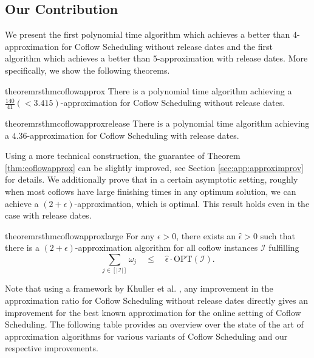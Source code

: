 \documentclass[11pt]{article}
\begin{document}
\subsection{Our Contribution}
\noindent We present the first polynomial time algorithm which achieves a better than $4$-approximation for Coflow Scheduling without release dates and the first algorithm which achieves a better than $5$-approximation with release dates.
More specifically, we show the following theorems.

\begin{restatable}{theorem}{rsthmcoflowapprox}\label{thm:coflowapprox}
There is a polynomial time algorithm achieving a $\frac{140}{41} (<3.415)$-approximation for Coflow Scheduling without release dates.
\end{restatable}

\begin{restatable}{theorem}{rsthmcoflowapproxrelease}\label{thm:coflowapproxrelease}
There is a polynomial time algorithm achieving a $4.36$-approximation for Coflow Scheduling with release dates.
\end{restatable}

Using a more technical construction, the guarantee of Theorem \ref{thm:coflowapprox} can be slightly improved, see Section \ref{sec:app:approximprov} for details. We additionally prove that in a certain asymptotic setting, roughly when most coflows have large finishing times in any optimum solution, we can achieve a $(2+\epsilon)$-approximation, which is optimal. This result holds even in the case with release dates.

\begin{restatable}{theorem}{rsthmcoflowapproxlarge}\label{thm:coflowapproxlarge}
 For any $\epsilon > 0$, there exists an $\hat{\epsilon} > 0$ such that there is a $(2+\epsilon)$-approximation algorithm for all coflow instances $\mathcal{I}$ fulfilling
 \begin{equation*}
     \sum_{j \in [|\mathcal{I}|]}\omega_j \quad \le \quad \hat{\epsilon}\cdot \mathrm{OPT}(\mathcal{I}).
 \end{equation*}
\end{restatable}

\noindent Note that using a framework by Khuller et al. \cite{khuller_select_2019}, any improvement in the approximation ratio for Coflow Scheduling without release dates directly gives an improvement for the best known approximation for the online setting of Coflow Scheduling.
The following table provides an overview over the state of the art of approximation algorithms for various variants of Coflow Scheduling and our respective improvements.
\end{document}
